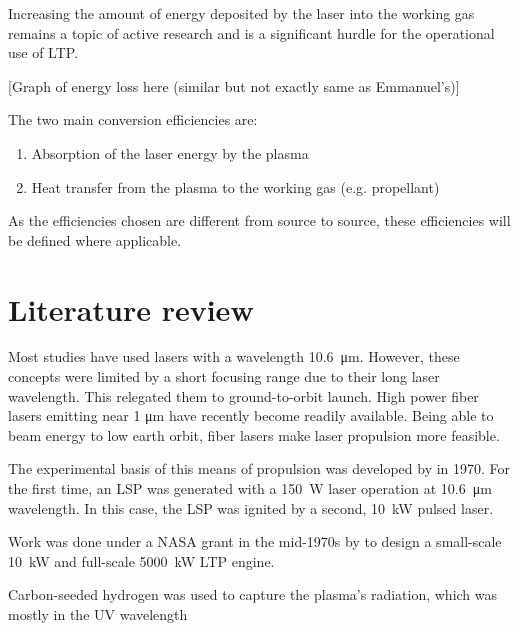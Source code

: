 
        Increasing the amount of energy deposited by the laser into the working gas remains a topic of active research and is a significant hurdle for the operational use of LTP.

        [Graph of energy loss here (similar but not exactly same as Emmanuel's)]

        The two main conversion efficiencies are:
        \begin{enumerate}
            \item Absorption of the laser energy by the plasma
            \item Heat transfer from the plasma to the working gas (e.g. propellant)
        \end{enumerate}

        As the efficiencies chosen are different from source to source, these efficiencies will be defined where applicable.
    
    \section{Literature review}
    
        Most studies have used  lasers with a wavelength \qty{10.6}{μm}. However, these concepts were limited by a short focusing range due to their long laser wavelength. This relegated them to ground-to-orbit launch. High power fiber lasers emitting near 1 μm have recently become readily available. Being able to beam energy to low earth orbit, fiber lasers make laser propulsion more feasible.


        The experimental basis of this means of propulsion was developed by \textcite{generalovContinuousOpticalDischarge1970} in 1970. For the first time, an LSP was generated with a \qty{150}{W}  laser operation at \qty{10.6}{μm} wavelength. In this case, the LSP was ignited by a second, \qty{10}{kW} pulsed  laser.
        

        Work was done under a NASA grant in the mid-1970s by \textcite{shojiLaserheatedRocketThruster1977,shojiPerformanceHeatTransfer1976a} to design a small-scale \qty{10}{kW} and full-scale \qty{5000}{kW} LTP engine. 
        
        Carbon-seeded hydrogen was used to capture the plasma's radiation, which was mostly in the UV wavelength 

